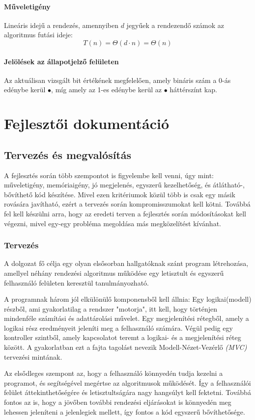 \documentclass{elteikthesis}
\begin{document}
\subsubsection{Műveletigény}
Lineáris idejű a rendezés, amennyiben $d$ jegyűek a rendezendő számok az algoritmus futási ideje:
$$T(n)=\Theta(d \cdot n) = \Theta(n)$$
\subsubsection{Jelölések az állapotjelző felületen}
Az aktuálisan vizsgált bit értékének megfelelően, amely bináris szám a 0-ás edénybe kerül \textcolor{swap}{\Huge$\bullet$}, míg amely az 1-es edénybe kerül az \textcolor{select}{\Huge$\bullet$} háttérszínt kap.

\chapter{Fejlesztői dokumentáció}

\section{Tervezés és megvalósítás}
A fejlesztés során több szempontot is figyelembe kell venni, úgy mint: műveletigény, memóriaigény, jó megjelenés, egyszerű kezelhetőség, és átlátható-, bővíthető kód készítése. Mivel ezen kritériumok közül több is csak egy másik rovására javítható, ezért a tervezés során kompromisszumokat kell kötni. Továbbá fel kell készülni arra, hogy az eredeti terven a fejlesztés során módosításokat kell végezni, mivel egy-egy probléma megoldása más megközelítést kívánhat.

\subsection{Tervezés}
A dolgozat fő célja egy olyan elsősorban hallgatóknak szánt program létrehozása, amellyel néhány rendezési algoritmus működése egy letisztult és egyszerű felhasználó felületen keresztül tanulmányozható.\par
A programnak három jól elkülönülő komponensből kell állnia:
Egy logikai(modell) részből, ami gyakorlatilag a rendszer "motorja", itt kell, hogy történjen mindenféle számítási és adattárolási művelet. Egy megjelenítési rétegből, amely a logikai rész eredményeit jeleníti meg a felhasználó számára. Végül pedig egy kontroller szintből, amely kapcsolatot teremt a logikai- és a megjelenítési réteg között. A gyakorlatban ezt a fajta tagolást nevezik Modell-Nézet-Vezérlő \emph{(MVC)} tervezési mintának.\par
Az elsődleges szempont az, hogy a felhasználó könnyedén tudja kezelni a programot, és segítségével megértse az algoritmusok működését. Így a felhasználói felület áttekinthetőségére és letisztultságára nagy hangsúlyt kell fektetni. Továbbá fontos az is, hogy a jövőben további rendezési eljárásokat is könnyedén meg lehessen jeleníteni a jelenlegiek mellett, így fontos a kód egyszerű bővíthetősége.
\end{document}
